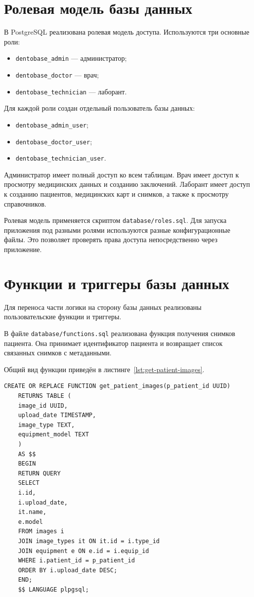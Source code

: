 \section{Ролевая модель базы данных}

В PostgreSQL реализована ролевая модель доступа. Используются три основные роли:

\begin{itemize}
	\item \texttt{dentobase\_admin} --- администратор;
	\item \texttt{dentobase\_doctor} --- врач;
	\item \texttt{dentobase\_technician} --- лаборант.
\end{itemize}

Для каждой роли создан отдельный пользователь базы данных:

\begin{itemize}
	\item \texttt{dentobase\_admin\_user};
	\item \texttt{dentobase\_doctor\_user};
	\item \texttt{dentobase\_technician\_user}.
\end{itemize}

Администратор имеет полный доступ ко всем таблицам. Врач имеет доступ к просмотру медицинских данных и созданию заключений. Лаборант имеет доступ к созданию пациентов, медицинских карт и снимков, а также к просмотру справочников.

Ролевая модель применяется скриптом \texttt{database/roles.sql}. Для запуска приложения под разными ролями используются разные конфигурационные файлы. Это позволяет проверять права доступа непосредственно через приложение.

\section{Функции и триггеры базы данных}

Для переноса части логики на сторону базы данных реализованы пользовательские функции и триггеры.

В файле \texttt{database/functions.sql} реализована функция получения снимков пациента. Она принимает идентификатор пациента и возвращает список связанных снимков с метаданными.

Общий вид функции приведён в листинге~\ref{lst:get-patient-images}.

\clearpage

\begin{lstlisting}[caption={Функция получения снимков пациента}, label={lst:get-patient-images}]
	CREATE OR REPLACE FUNCTION get_patient_images(p_patient_id UUID)
	RETURNS TABLE (
	image_id UUID,
	upload_date TIMESTAMP,
	image_type TEXT,
	equipment_model TEXT
	)
	AS $$
	BEGIN
	RETURN QUERY
	SELECT
	i.id,
	i.upload_date,
	it.name,
	e.model
	FROM images i
	JOIN image_types it ON it.id = i.type_id
	JOIN equipment e ON e.id = i.equip_id
	WHERE i.patient_id = p_patient_id
	ORDER BY i.upload_date DESC;
	END;
	$$ LANGUAGE plpgsql;
\end{lstlisting}

